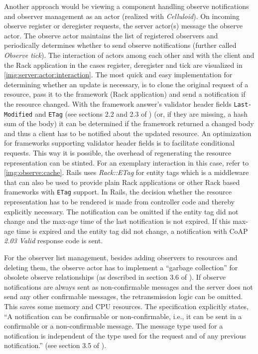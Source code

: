 		Another approach would be viewing a component handling observe
		notifications and observer management as an actor (realized with
		\emph{Celluloid}). On incoming observe register or deregister requests,
		the server actor(s) message the observe actor. The observe actor
		maintains the list of registered observers and periodically determines
		whether to send observe notifications (further called \emph{Observe
		tick}). The interaction of actors among each other and with the client
		and the Rack application in the cases register, deregister and tick are
		visualized in \autoref{img:server:actor:interaction}. The most quick
		and easy implementation for determining whether an update is necessary,
		is to clone the original request of a resource, pass it to the
		framework (Rack application) and send a notification if the resource
		changed. With the framework answer's validator header fields
		\texttt{Last-Modified} and \texttt{ETag} (see sections 2.2 and 2.3 of
		\cite{http-2}) (or, if they are missing, a hash sum of the body) it can
		be determined if the framework returned a changed body and thus a
		client has to be notified about the updated resource. An optimization
		for frameworks supporting validator header fields is to facilitate
		conditional requests. This way it is possible, the overhead of
		regenerating the resource representation can be stinted. For an
		exemplary interaction in this case, refer to
		\autoref{img:observe:cache}. \ac{Rails} uses \emph{Rack::ETag} for
		entity tags which is a middleware that can also be used to provide
		plain Rack applications or other Rack based frameworks with
		\texttt{ETag} support. In \ac{Rails}, the decision whether the resource
		representation has to be rendered is made from controller code and
		thereby explicitly necessary. The notification can be omitted if the
		entity tag did not change and the max-age time of the last notification
		is not expired. If this max-age time is expired and the entity tag did
		not change, a notification with \ac{CoAP} \emph{2.03 Valid} response
		code is sent.
		
		For the observer list management, besides adding observers to resources
		and deleting them, the observe actor has to implement a
		\enquote{garbage collection} for obsolete observe relationships (as
		described in section 3.6 of \cite{observe}). If observe notifications
		are always sent as non-confirmable messages and the server does not
		send any other confirmable messages, the retransmission logic can be
		omitted. This saves some memory and \ac{CPU} resources. The
		specification explicitly states, \enquote{A notification can be
		confirmable or non-confirmable, i.e., it can be sent in a confirmable
		or a non-confirmable message. The message type used for a notification
		is independent of the type used for the request and of any previous
		notification.} (see section 3.5 of \cite{observe}).

